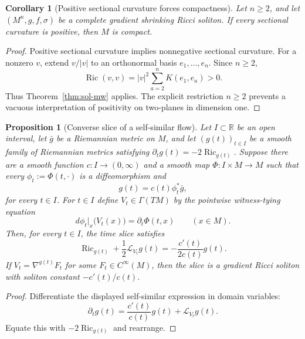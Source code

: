 \documentclass[10pt]{coll-l}
\newtheorem{corollary}[theorem]{Corollary}
\newtheorem{proposition}[theorem]{Proposition}
\theoremstyle{definition}
\theoremstyle{remark}
\numberwithin{section}{chapter}
\numberwithin{equation}{chapter}
\newcommand{\Ric}{\operatorname{Ric}}
\begin{document}
\begin{corollary}[Positive sectional curvature forces compactness]
\label{cor:sol-positive-sectional-compact}
Let $n\geq2$, and let $(M^n,g,f,\sigma)$ be a complete gradient shrinking
Ricci soliton.  If every sectional curvature is positive, then $M$ is
compact.
\end{corollary}

\begin{proof}
Positive sectional curvature implies nonnegative sectional curvature.  For
a nonzero $v$, extend $v/|v|$ to an orthonormal basis
$e_1,\ldots,e_n$.  Since $n\geq2$,
\[
 \Ric(v,v)=|v|^2\sum_{a=2}^nK(e_1,e_a)>0.
\]
Thus Theorem~\ref{thm:sol-mw} applies.  The explicit restriction $n\geq2$
prevents a vacuous interpretation of positivity on two-planes in dimension
one.
\end{proof}

\begin{proposition}[Converse slice of a self-similar flow]
\label{prop:sol-converse-self-similar}
Let $I\subset\mathbb R$ be an open interval, let $\bar g$ be a Riemannian
metric on $M$, and let $(g(t))_{t\in I}$ be a smooth family of Riemannian
metrics satisfying $\partial_tg(t)=-2\Ric_{g(t)}$.  Suppose there are a
smooth function $c:I\to(0,\infty)$ and a smooth
map $\Phi:I\times M\to M$ such that every
$\phi_t:=\Phi(t,\mathord\cdot)$ is a diffeomorphism and
\[
                    g(t)=c(t)\phi_t^*\bar g,
\]
for every $t\in I$.  For $t\in I$ define $V_t\in\Gamma(TM)$ by the
pointwise witness-tying equation
\begin{equation}
 d\phi_t|_x\bigl(V_t(x)\bigr)=\partial_t\Phi(t,x)
       \qquad(x\in M).                                   \label{eq:sol-converse-generator}
\end{equation}
Then, for every $t\in I$, the time slice satisfies
\begin{equation}
 \Ric_{g(t)}+\frac12\mathcal L_{V_t}g(t)
    =-\frac{c'(t)}{2c(t)}g(t).                            \label{eq:sol-converse-soliton}
\end{equation}
If $V_t=\nabla^{g(t)}F_t$ for some $F_t\in C^\infty(M)$, then the slice is
a gradient Ricci soliton with soliton constant $-c'(t)/c(t)$.
\end{proposition}

\begin{proof}
Differentiate the displayed self-similar expression in domain variables:
\[
 \partial_tg(t)=\frac{c'(t)}{c(t)}g(t)+\mathcal L_{V_t}g(t).
\]
Equate this with $-2\Ric_{g(t)}$ and rearrange.
\end{proof}
\end{document}
